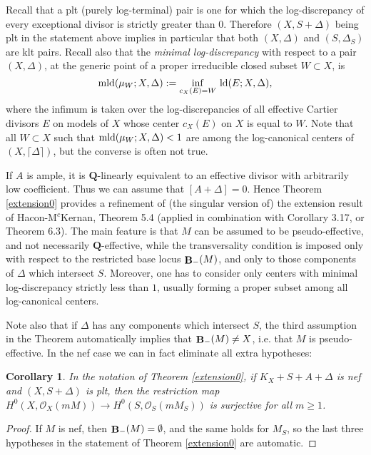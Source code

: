 \documentclass[11pt]{amsart}
\theoremstyle{plain}
\newtheorem{corollaryalpha}[theoremalpha]{Corollary}
\theoremstyle{definition}
\newcommand{\QQ}{\mathbf{Q}}
\newcommand{\OO}{\mathcal  {O}}
\DeclareMathOperator{\BB}{{\bf B}}
\begin{document}
Recall that a plt (purely log-terminal) pair is one for which the log-discrepancy of every exceptional 
divisor is strictly greater than $0$. Therefore $(X, S+ \Delta)$ being plt in the statement above implies 
in particular that both $(X, \Delta)$ and $(S, \Delta_S)$ are klt pairs. Recall also that the \emph{minimal log-discrepancy} 
with respect to a pair $(X, \Delta)$, at the generic point of a proper irreducible closed subset $W \subset X$, is
$${\rm mld}(\mu_W ; X, \Delta): = \underset{c_X(E) = W}{\rm inf}~ {\rm ld} (E; X, \Delta),$$
where the infimum is taken over the log-discrepancies of all effective Cartier divisors $E$ on models of $X$ whose center 
$c_X(E)$ on $X$ is equal to $W$. 
Note that all $W\subset X$ such that  ${\rm mld}(\mu_W ; X, \Delta) < 1$ are among the log-canonical centers of 
$(X, \lceil \Delta\rceil)$, but the converse is often not true.

If $A$ is ample, it is $\QQ$-linearly equivalent to an effective divisor with arbitrarily low coefficient. Thus we can assume that $[A + \Delta] = 0$. Hence Theorem \ref{extension0} provides a refinement of (the singular version of) the extension result of Hacon-M$^c$Kernan, \cite{hm2} Theorem 5.4 (applied in combination with \cite{hm1} Corollary 3.17, or \cite{hm2} Theorem 6.3). The main feature is that $M$ can be assumed to be pseudo-effective, and not necessarily $\QQ$-effective, while 
the transversality condition is imposed only with respect to the restricted base locus $\BB_{-} (M)$, and only to those components of $\Delta$ which intersect $S$. Moreover, one has to consider only centers with minimal log-discrepancy 
strictly less than $1$, usually forming a proper subset among all log-canonical centers. 

Note also that if $\Delta$ has any components which intersect $S$, the third assumption in the Theorem automatically implies that $\BB_{-} (M) \neq X$, i.e. that $M$ is pseudo-effective. In the nef case we can in fact eliminate all extra 
hypotheses:

\begin{corollaryalpha}\label{nef}
In the notation of Theorem \ref{extension0}, if $K_X + S + A + \Delta$ is nef and $(X, S+ \Delta)$ is plt, then the restriction map $H^0 (X, \OO_X (mM)) \longrightarrow H^0 (S, \OO_S (mM_S))$ is surjective for all $m \ge 1$. 
\end{corollaryalpha}
\begin{proof}
If $M$ is nef, then $\BB_{-} (M) = \emptyset$, and the same holds for $M_S$, so the last three hypotheses in the statement of Theorem \ref{extension0} are automatic.
\end{proof}
\end{document}
